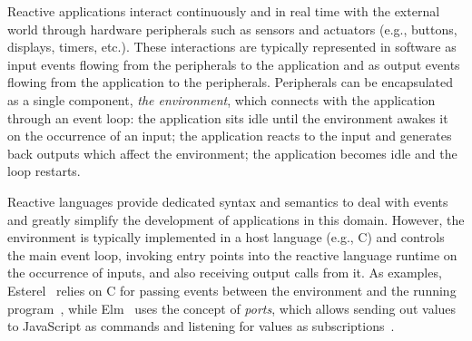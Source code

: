 \documentclass[sigplan,10pt,review,anonymous]{acmart}\settopmatter{printfolios=true,printccs=false,printacmref=false}
\begin{document}

Reactive applications interact continuously and in real time with the external
world through hardware peripherals such as sensors and actuators (e.g.,
buttons, displays, timers, etc.).
%
These interactions are typically represented in software as input events
flowing from the peripherals to the application and as output events flowing
from the application to the peripherals.
%
Peripherals can be encapsulated as a
single component, \emph{the environment}, which connects with the application
through an event loop:
the application sits idle until the environment awakes it on the occurrence of
an input;
the application reacts to the input and generates back outputs
which affect the environment;
the application becomes idle and the loop restarts.

Reactive languages provide dedicated syntax and semantics to deal with events
and greatly simplify the development of applications in this domain.
%
However, the environment is typically implemented in a host language (e.g., C)
and controls the main event loop, invoking entry points into the reactive
language runtime on the occurrence of inputs, and also receiving output calls
from it.
%
As examples, Esterel~\cite{esterel.ieee91} relies on C for passing events
between the environment and the running program~\cite{esterel.book.compiling},
while Elm~\cite{frp.elm} uses the concept of \emph{ports}, which allows sending
out values to JavaScript as commands and listening for values as
subscriptions~\cite{frp.elm.ports}.
\end{document}
